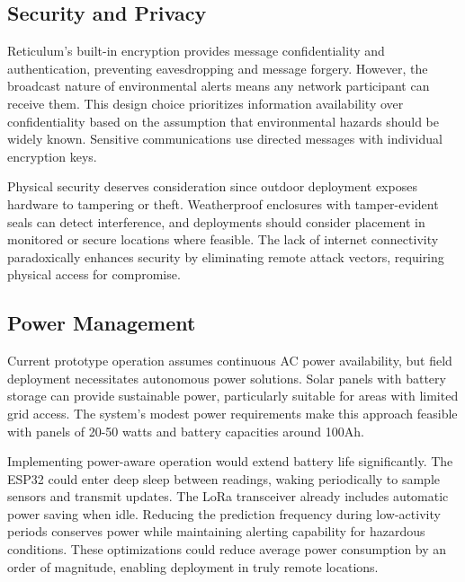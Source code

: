 \subsection{Security and Privacy}

Reticulum's built-in encryption provides message confidentiality and authentication, preventing eavesdropping and message forgery. However, the broadcast nature of environmental alerts means any network participant can receive them. This design choice prioritizes information availability over confidentiality based on the assumption that environmental hazards should be widely known. Sensitive communications use directed messages with individual encryption keys.

Physical security deserves consideration since outdoor deployment exposes hardware to tampering or theft. Weatherproof enclosures with tamper-evident seals can detect interference, and deployments should consider placement in monitored or secure locations where feasible. The lack of internet connectivity paradoxically enhances security by eliminating remote attack vectors, requiring physical access for compromise.

\subsection{Power Management}

Current prototype operation assumes continuous AC power availability, but field deployment necessitates autonomous power solutions. Solar panels with battery storage can provide sustainable power, particularly suitable for areas with limited grid access. The system's modest power requirements make this approach feasible with panels of 20-50 watts and battery capacities around 100Ah.

Implementing power-aware operation would extend battery life significantly. The ESP32 could enter deep sleep between readings, waking periodically to sample sensors and transmit updates. The LoRa transceiver already includes automatic power saving when idle. Reducing the prediction frequency during low-activity periods conserves power while maintaining alerting capability for hazardous conditions. These optimizations could reduce average power consumption by an order of magnitude, enabling deployment in truly remote locations.
